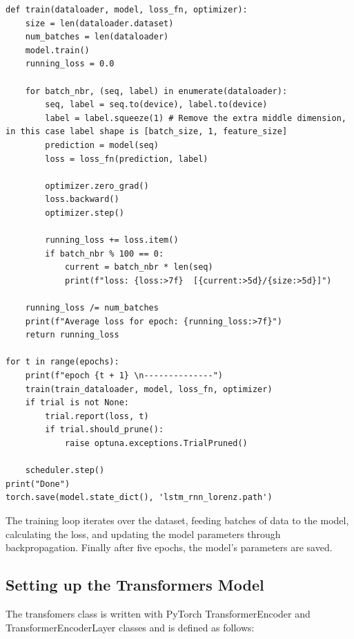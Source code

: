 \documentclass[11pt]{article}
\begin{document}
\begin{lstlisting}
def train(dataloader, model, loss_fn, optimizer):
    size = len(dataloader.dataset)
    num_batches = len(dataloader)
    model.train()
    running_loss = 0.0

    for batch_nbr, (seq, label) in enumerate(dataloader):
        seq, label = seq.to(device), label.to(device)
        label = label.squeeze(1) # Remove the extra middle dimension, in this case label shape is [batch_size, 1, feature_size]
        prediction = model(seq)
        loss = loss_fn(prediction, label)

        optimizer.zero_grad()
        loss.backward()
        optimizer.step()

        running_loss += loss.item()
        if batch_nbr % 100 == 0:
            current = batch_nbr * len(seq)
            print(f"loss: {loss:>7f}  [{current:>5d}/{size:>5d}]")

    running_loss /= num_batches
    print(f"Average loss for epoch: {running_loss:>7f}")
    return running_loss

for t in range(epochs):
    print(f"epoch {t + 1} \n--------------")
    train(train_dataloader, model, loss_fn, optimizer)
    if trial is not None:
        trial.report(loss, t)
        if trial.should_prune():
            raise optuna.exceptions.TrialPruned()

    scheduler.step()
print("Done")
torch.save(model.state_dict(), 'lstm_rnn_lorenz.path')
\end{lstlisting}
The training loop iterates over the dataset, feeding batches of data to the model, calculating the loss, and updating the model parameters through backpropagation. Finally after five epochs, the model's parameters are saved.

\subsection{Setting up the Transformers Model}

The transfomers class is written with PyTorch TransformerEncoder and TransformerEncoderLayer classes and is defined as follows:
\end{document}
